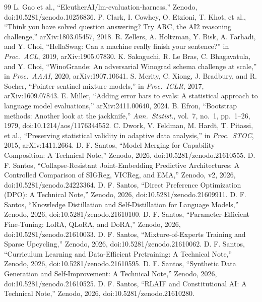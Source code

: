 \documentclass[conference]{IEEEtran}
\begin{document}
\begin{thebibliography}{99}
 L. Gao et al., ``EleutherAI/lm-evaluation-harness,'' Zenodo, doi:10.5281/zenodo.10256836.
 P. Clark, I. Cowhey, O. Etzioni, T. Khot, et al., ``Think you have solved question answering? Try ARC, the AI2 reasoning challenge,'' arXiv:1803.05457, 2018.
 R. Zellers, A. Holtzman, Y. Bisk, A. Farhadi, and Y. Choi, ``HellaSwag: Can a machine really finish your sentence?'' in \emph{Proc.\ ACL}, 2019, arXiv:1905.07830.
 K. Sakaguchi, R. Le Bras, C. Bhagavatula, and Y. Choi, ``WinoGrande: An adversarial Winograd schema challenge at scale,'' in \emph{Proc.\ AAAI}, 2020, arXiv:1907.10641.
 S. Merity, C. Xiong, J. Bradbury, and R. Socher, ``Pointer sentinel mixture models,'' in \emph{Proc.\ ICLR}, 2017, arXiv:1609.07843.
 E. Miller, ``Adding error bars to evals: A statistical approach to language model evaluations,'' arXiv:2411.00640, 2024.
 B. Efron, ``Bootstrap methods: Another look at the jackknife,'' \emph{Ann.\ Statist.}, vol.~7, no.~1, pp.~1--26, 1979, doi:10.1214/aos/1176344552.
 C. Dwork, V. Feldman, M. Hardt, T. Pitassi, et al., ``Preserving statistical validity in adaptive data analysis,'' in \emph{Proc.\ STOC}, 2015, arXiv:1411.2664.
 D. F. Santos, ``Model Merging for Capability Composition: A Technical Note,'' Zenodo, 2026, doi:10.5281/zenodo.21610555.
 D. F. Santos, ``Collapse-Resistant Joint-Embedding Predictive Architectures: A Controlled Comparison of SIGReg, VICReg, and EMA,'' Zenodo, v2, 2026, doi:10.5281/zenodo.24223364.
 D. F. Santos, ``Direct Preference Optimization (DPO): A Technical Note,'' Zenodo, 2026, doi:10.5281/zenodo.21609911.
 D. F. Santos, ``Knowledge Distillation and Self-Distillation for Language Models,'' Zenodo, 2026, doi:10.5281/zenodo.21610100.
 D. F. Santos, ``Parameter-Efficient Fine-Tuning: LoRA, QLoRA, and DoRA,'' Zenodo, 2026, doi:10.5281/zenodo.21610033.
 D. F. Santos, ``Mixture-of-Experts Training and Sparse Upcycling,'' Zenodo, 2026, doi:10.5281/zenodo.21610062.
 D. F. Santos, ``Curriculum Learning and Data-Efficient Pretraining: A Technical Note,'' Zenodo, 2026, doi:10.5281/zenodo.21610595.
 D. F. Santos, ``Synthetic Data Generation and Self-Improvement: A Technical Note,'' Zenodo, 2026, doi:10.5281/zenodo.21610525.
 D. F. Santos, ``RLAIF and Constitutional AI: A Technical Note,'' Zenodo, 2026, doi:10.5281/zenodo.21610280.
\end{thebibliography}
\end{document}

